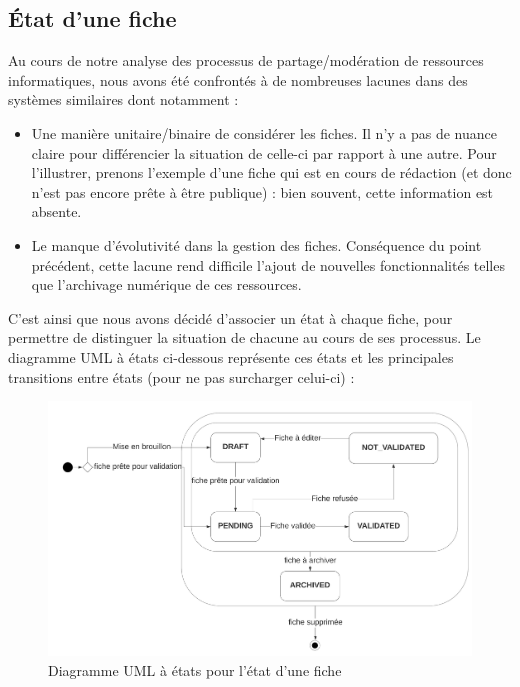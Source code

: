 \pagebreak

\subsection*{État d'une fiche}

Au cours de notre analyse des processus de partage/modération de ressources informatiques, nous avons été confrontés à de nombreuses lacunes dans des systèmes similaires dont notamment :
\begin{itemize}
    \item Une manière unitaire/binaire de considérer les fiches. Il n'y a pas de nuance claire pour différencier la situation de celle-ci par rapport à une autre. Pour l'illustrer, prenons l'exemple d'une fiche qui est en cours de rédaction (et donc n'est pas encore prête à être publique) : bien souvent, cette information est absente.
    \item Le manque d'évolutivité dans la gestion des fiches. Conséquence du point précédent, cette lacune rend difficile l'ajout de nouvelles fonctionnalités telles que l'archivage numérique de ces ressources. 
\end{itemize}

C'est ainsi que nous avons décidé d'associer un état à chaque fiche, pour permettre de distinguer la situation de chacune au cours de ses processus. Le diagramme UML à états ci-dessous représente ces états et les principales transitions entre états (pour ne pas surcharger celui-ci) :

\begin{figure}[H]
    \includegraphics[width=\textwidth,height=\textheight,keepaspectratio]{images/StateFiches.png}
    \centering
    \caption{Diagramme UML à états pour l'état d'une fiche}
    \label{pic:stateDiagramForFiches}
\end{figure}

